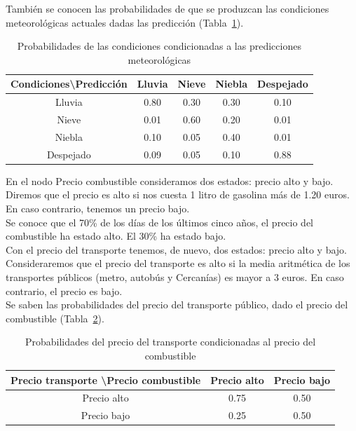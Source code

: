 \documentclass[12pt,a4paper,twoside,openright,titlepage,final]{article}
\begin{document}
También se conocen las probabilidades de que se produzcan las condiciones meteorológicas actuales dadas las predicción (Tabla~\ref{tbl:condicionadas}).

\begin{table}[htbp!]
	\centering
	\caption{Probabilidades de las condiciones condicionadas a las predicciones meteorológicas}
	\label{tbl:condicionadas}
	\begin{tabular}{@{}ccccc@{}}
		\toprule
		Condiciones\textbackslash Predicción & Lluvia & Nieve & Niebla & Despejado \\ \midrule
		Lluvia                               & 0.80   & 0.30  & 0.30   & 0.10      \\
		Nieve                                & 0.01   & 0.60  & 0.20   & 0.01      \\
		Niebla                               & 0.10   & 0.05  & 0.40   & 0.01      \\
		Despejado                            & 0.09   & 0.05  & 0.10   & 0.88      \\ \bottomrule
	\end{tabular}
\end{table} 

En el nodo Precio combustible consideramos dos estados: precio alto y bajo. Diremos que el precio es alto si nos cuesta 1 litro de gasolina más de 1.20 euros. En caso contrario, tenemos un precio bajo.\\

Se conoce que el 70\% de los días de los últimos cinco años, el precio del combustible ha estado alto. El 30\% ha estado bajo.\\

Con el precio del transporte tenemos, de nuevo, dos estados: precio alto y bajo. Consideraremos que el precio del transporte es alto si la media aritmética de los transportes públicos (metro, autobús y Cercanías) es mayor a 3 euros. En caso contrario, el precio es bajo.\\

Se saben las probabilidades del precio del transporte público, dado el precio del combustible (Tabla~\ref{tbl:condicionadas_2}).

\begin{table}[htbp!]
	\centering
	\caption{Probabilidades del precio del transporte condicionadas al precio del combustible}
	\label{tbl:condicionadas_2}
	\begin{tabular}{@{}ccc@{}}
		\toprule
		Precio transporte \textbackslash Precio combustible & Precio alto & Precio bajo \\ \midrule
		Precio alto                                         & 0.75        & 0.50        \\
		Precio bajo                                         & 0.25        & 0.50        \\ \bottomrule
	\end{tabular}
\end{table}
\end{document}
